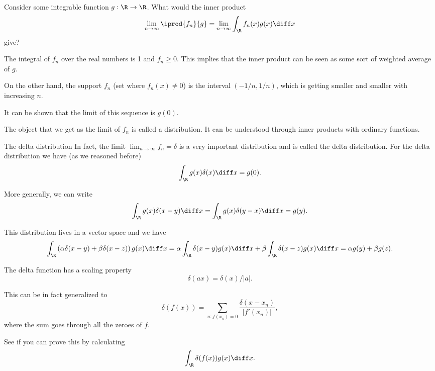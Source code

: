\begin{frame}
	Consider some integrable function $ g: \R \to \R $. What would the inner product
	\[ \lim_{n\to\infty} \iprod{f_n}{g} = \lim_{n\to\infty} \int_\R f_n(x) g(x) \diff x \]
	give?
	
	\pause
	The integral of $ f_n $ over the real numbers is 1 and $ f_n \geq 0 $. This implies that the inner product can be seen as some sort of weighted average of $ g $.
	
	\pause
	On the other hand, the support $ f_n $ (set where $ f_n(x)\neq 0 $) is the interval $ (-1/n,1/n) $, which is getting smaller and smaller with increasing $ n $. 
	
	\pause
	It can be shown that the limit of this sequence is $ g(0) $. 
	
	\pause
	The object that we get as the limit of $ f_n $ is called a \alert{distribution}. It can be understood through inner products with ordinary functions.
\end{frame}

\begin{frame}{The delta distribution}
	In fact, the limit $ \lim_{n \to \infty} f_n =  \delta $ is a very important distribution and is called the \alert{delta distribution}. For the delta distribution we have (as we reasoned before)
	\[ \int_\R g(x) \delta(x) \diff x = g(0). \]
	
	\pause
	More generally, we can write
	\[ \int_\R g(x) \delta(x-y) \diff x = \int_\R g(x) \delta(y-x) \diff x = g(y). \]
	
	\pause
	This distribution lives in a vector space and we have
	\[ \int_\R \left( \alpha \delta(x-y) + \beta \delta (x-z)\right) g(x) \diff x =  
	\alpha \int_\R\delta(x-y) g(x) \diff x +
	\beta \int_\R \delta (x-z) g(x) \diff x = \alpha g(y) + \beta g(z).
	\]
\end{frame}

\begin{frame}
	The delta function has a scaling property
	\[ \delta(a x) = \delta(x)/|a|. \]
	
	\pause
	This can be in fact generalized to 
	\[ \delta(f(x)) = \sum_{n:f(x_n)=0} \frac{\delta(x-x_n)}{|f'(x_n)|}, \]
	where the sum goes through all the zeroes of $ f $. 
	
	\pause
	See if you can prove this by calculating 
	\[ \int_\R \delta(f(x)) g(x) \diff x. \]
\end{frame}

